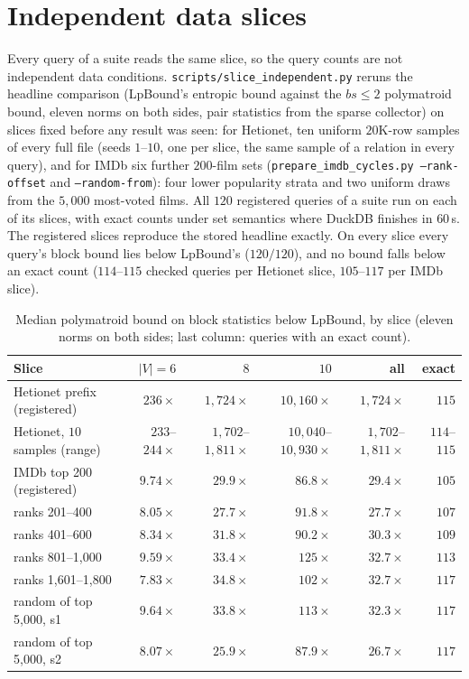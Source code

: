 \documentclass[11pt]{article}
\begin{document}
\section{Independent data slices}
Every query of a suite reads the same slice, so the query counts are not
independent data conditions. \texttt{scripts/slice\_independent.py} reruns the
headline comparison (LpBound's entropic bound against the $bs{\le}2$
polymatroid bound, eleven norms on both sides, pair statistics from the sparse
collector) on slices fixed before any result was seen: for Hetionet, ten
uniform $20$K-row samples of every full file (seeds $1$--$10$, one per slice,
the same sample of a relation in every query), and for IMDb six further
$200$-film sets (\texttt{prepare\_imdb\_cycles.py --rank-offset} and
\texttt{--random-from}): four lower popularity strata and two uniform draws
from the $5{,}000$ most-voted films. All $120$ registered queries of a suite
run on each of its slices, with exact counts under set semantics where DuckDB
finishes in $60$\,s. The registered slices reproduce the stored headline
exactly. On every slice every query's block bound lies below LpBound's
($120/120$), and no bound falls below an exact count ($114$--$115$ checked
queries per Hetionet slice, $105$--$117$ per IMDb slice).

\begin{table}[h]
\centering
\caption{Median polymatroid bound on block statistics below LpBound, by slice
(eleven norms on both sides; last column: queries with an exact count).}
\label{tab:slices}
\small\setlength{\tabcolsep}{3pt}
\begin{tabular}{@{}lrrrrr@{}}
\toprule
Slice & $|V|{=}6$ & $8$ & $10$ & all & exact \\
\midrule
Hetionet prefix (registered) & $236\times$ & $1{,}724\times$ & $10{,}160\times$ & $1{,}724\times$ & $115$ \\
Hetionet, $10$ samples (range) & $233$--$244\times$ & $1{,}702$--$1{,}811\times$ & $10{,}040$--$10{,}930\times$ & $1{,}702$--$1{,}811\times$ & $114$--$115$ \\
\midrule
IMDb top 200 (registered) & $9.74\times$ & $29.9\times$ & $86.8\times$ & $29.4\times$ & $105$ \\
ranks 201--400 & $8.05\times$ & $27.7\times$ & $91.8\times$ & $27.7\times$ & $107$ \\
ranks 401--600 & $8.34\times$ & $31.8\times$ & $90.2\times$ & $30.3\times$ & $109$ \\
ranks 801--1{,}000 & $9.59\times$ & $33.4\times$ & $125\times$ & $32.7\times$ & $113$ \\
ranks 1{,}601--1{,}800 & $7.83\times$ & $34.8\times$ & $102\times$ & $32.7\times$ & $117$ \\
random of top 5{,}000, s1 & $9.64\times$ & $33.8\times$ & $113\times$ & $32.3\times$ & $117$ \\
random of top 5{,}000, s2 & $8.07\times$ & $25.9\times$ & $87.9\times$ & $26.7\times$ & $117$ \\
\bottomrule
\end{tabular}
\end{table}
\end{document}

